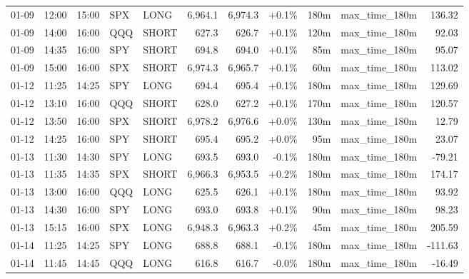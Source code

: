 \documentclass[11pt,a4paper,twoside]{article}
\begin{document}
\begin{center}
\begin{longtable}{>{\color{txtmain}}l l l l l r r r r >{\color{txtmain}}l r}
01-09 & 12:00 & 15:00 & SPX & LONG & 6,964.1 & 6,974.3 & \textcolor{wingreen}{+0.1\%} & 180m & max\_time\_180m & \textcolor{wingreen}{136.32} \\
01-09 & 14:00 & 16:00 & QQQ & SHORT & 627.3 & 626.7 & \textcolor{wingreen}{+0.1\%} & 120m & max\_time\_180m & \textcolor{wingreen}{92.03} \\
01-09 & 14:35 & 16:00 & SPY & SHORT & 694.8 & 694.0 & \textcolor{wingreen}{+0.1\%} & 85m & max\_time\_180m & \textcolor{wingreen}{95.07} \\
01-09 & 15:00 & 16:00 & SPX & SHORT & 6,974.3 & 6,965.7 & \textcolor{wingreen}{+0.1\%} & 60m & max\_time\_180m & \textcolor{wingreen}{113.02} \\
01-12 & 11:25 & 14:25 & SPY & LONG & 694.4 & 695.4 & \textcolor{wingreen}{+0.1\%} & 180m & max\_time\_180m & \textcolor{wingreen}{129.69} \\
01-12 & 13:10 & 16:00 & QQQ & SHORT & 628.0 & 627.2 & \textcolor{wingreen}{+0.1\%} & 170m & max\_time\_180m & \textcolor{wingreen}{120.57} \\
01-12 & 13:50 & 16:00 & SPX & SHORT & 6,978.2 & 6,976.6 & \textcolor{wingreen}{+0.0\%} & 130m & max\_time\_180m & \textcolor{wingreen}{12.79} \\
01-12 & 14:25 & 16:00 & SPY & SHORT & 695.4 & 695.2 & \textcolor{wingreen}{+0.0\%} & 95m & max\_time\_180m & \textcolor{wingreen}{23.07} \\
01-13 & 11:30 & 14:30 & SPY & LONG & 693.5 & 693.0 & \textcolor{lossred}{-0.1\%} & 180m & max\_time\_180m & \textcolor{lossred}{-79.21} \\
01-13 & 11:35 & 14:35 & SPX & SHORT & 6,966.3 & 6,953.5 & \textcolor{wingreen}{+0.2\%} & 180m & max\_time\_180m & \textcolor{wingreen}{174.17} \\
01-13 & 13:00 & 16:00 & QQQ & LONG & 625.5 & 626.1 & \textcolor{wingreen}{+0.1\%} & 180m & max\_time\_180m & \textcolor{wingreen}{93.92} \\
01-13 & 14:30 & 16:00 & SPY & LONG & 693.0 & 693.8 & \textcolor{wingreen}{+0.1\%} & 90m & max\_time\_180m & \textcolor{wingreen}{98.23} \\
01-13 & 15:15 & 16:00 & SPX & LONG & 6,948.3 & 6,963.3 & \textcolor{wingreen}{+0.2\%} & 45m & max\_time\_180m & \textcolor{wingreen}{205.59} \\
01-14 & 11:25 & 14:25 & SPY & LONG & 688.8 & 688.1 & \textcolor{lossred}{-0.1\%} & 180m & max\_time\_180m & \textcolor{lossred}{-111.63} \\
01-14 & 11:45 & 14:45 & QQQ & LONG & 616.8 & 616.7 & \textcolor{lossred}{-0.0\%} & 180m & max\_time\_180m & \textcolor{lossred}{-16.49} \\

\end{longtable}
\end{center}
\end{document}

